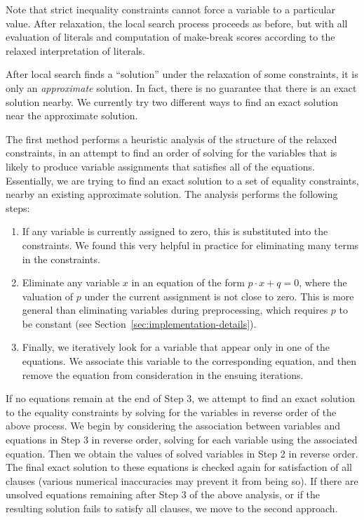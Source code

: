 \documentclass[runningheads]{llncs}
\begin{document}
Note that strict inequality constraints cannot force a variable to a particular value. After relaxation, the local search process proceeds as before, but with all evaluation of literals and computation of make-break scores according to the relaxed interpretation of literals.

After local search finds a ``solution'' under the relaxation of some constraints, it is only an \emph{approximate} solution. In fact, there is no guarantee that there is an exact solution nearby. We currently try two different ways to find an exact solution near the approximate solution.

The first method performs a heuristic analysis of the structure of the relaxed constraints, in an attempt to find an order of solving for the variables that is likely to produce variable assignments that satisfies all of the equations. Essentially, we are trying to find an exact solution to a set of equality constraints, nearby an existing approximate solution. The analysis performs the following steps:
\begin{enumerate}
\item If any variable is currently assigned to zero, this is substituted into the constraints. We found this very helpful in practice for eliminating many terms in the constraints.
\item Eliminate any variable $x$ in an equation of the form $p\cdot x+q=0$, where the valuation of $p$ under the current assignment is not close to zero. This is more general than eliminating variables during preprocessing, which requires $p$ to be constant (see Section~\ref{sec:implementation-details}).
\item Finally, we iteratively look for a variable that appear only in one of the equations. We associate this variable to the corresponding equation, and then remove the equation from consideration in the ensuing iterations.
\end{enumerate}
If no equations remain at the end of Step 3, we attempt to find an exact solution to the equality constraints by solving for the variables in reverse order of the above process. We begin by considering the association between variables and equations in Step 3 in reverse order, solving for each variable using the associated equation. Then we obtain the values of solved variables in Step 2 in reverse order. The final exact solution to these equations is checked again for satisfaction of all clauses (various numerical inaccuracies may prevent it from being so). If there are unsolved equations remaining after Step 3 of the above analysis, or if the resulting solution fails to satisfy all clauses, we move to the second approach. 
\end{document}
